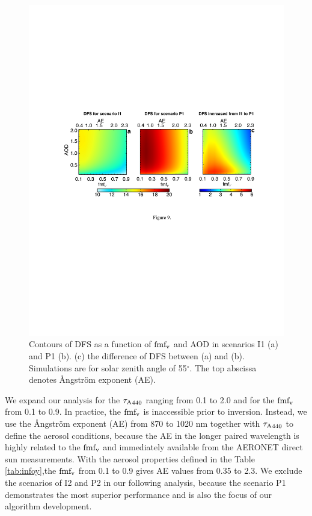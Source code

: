 \begin{figure}[t]
  \centering
  \includegraphics[width={\textwidth}]{figures/info09.pdf}
  \caption{Contours of DFS as a function of $\text{fmf}_\text{v}$ and AOD in scenarios
I1 (a) and P1 (b). (c) the difference of DFS between (a) and (b).
Simulations are for solar zenith angle of 55$^\circ$. The top abscissa denotes
Ångström exponent (AE).}
  \label{fig:infodfs2}
\end{figure}

We expand our analysis for the ${\tau_\text{A}}_{440}$ ranging from 0.1 to 2.0 
and for the $\text{fmf}_\text{v}$ from 0.1 to 0.9. In practice, the $\text{fmf}_\text{v}$ is 
inaccessible prior to inversion. Instead, we use the 
Ångström exponent (AE) from 870 to 1020 nm together with
${\tau_\text{A}}_{440}$ to define the aerosol conditions, because the AE
in the longer paired wavelength is highly related to the $\text{fmf}_\text{v}$
\citep{Schuster06} and immediately available from the AERONET direct sun 
measurements. With the aerosol properties defined in the Table
\ref{tab:infoy},the $\text{fmf}_\text{v}$ from 0.1 to 0.9 gives AE values from
0.35 to 2.3. We exclude the scenarios of I2 and P2 in our following
analysis, because the scenario P1 demonstrates the most superior
performance and is also the focus of our algorithm development.

